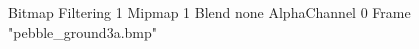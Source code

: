 {Bitmap
	{Filtering 1}
	{Mipmap 1}
	{Blend none}
	{AlphaChannel 0}
	{Frame "pebble_ground3a.bmp"}
}
